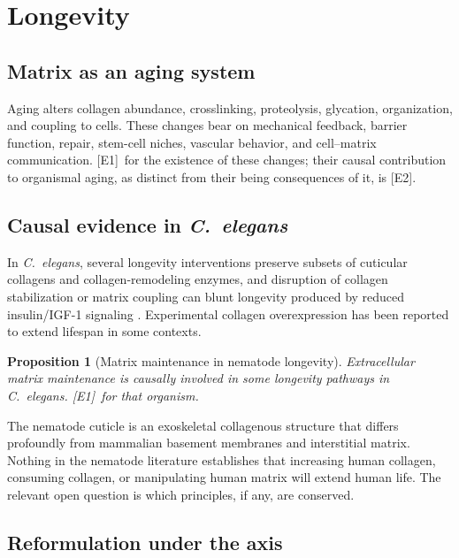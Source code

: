 \documentclass[11pt,a4paper]{article}
\theoremstyle{plain}
\newtheorem{proposition}{Proposition}[section]
\theoremstyle{definition}
\theoremstyle{remark}
\newcommand{\tier}[1]{\textup{\textsc{[#1]}}}
\newcommand{\Eone}{\tier{E1}}
\newcommand{\Etwo}{\tier{E2}}
\begin{document}
\section{Longevity}\label{sec:longevity}

\subsection{Matrix as an aging system}

Aging alters collagen abundance, crosslinking, proteolysis, glycation, organization, and coupling to cells. These changes bear on mechanical feedback, barrier function, repair, stem-cell niches, vascular behavior, and cell--matrix communication. \Eone\ for the existence of these changes; their causal contribution to organismal aging, as distinct from their being consequences of it, is \Etwo.

\subsection{Causal evidence in \emph{C.\ elegans}}

In \emph{C.\ elegans}, several longevity interventions preserve subsets of cuticular collagens and collagen-remodeling enzymes, and disruption of collagen stabilization or matrix coupling can blunt longevity produced by reduced insulin/IGF-1 signaling \cite{ewald2015,teuscher2024}. Experimental collagen overexpression has been reported to extend lifespan in some contexts.

\begin{proposition}[Matrix maintenance in nematode longevity]
Extracellular matrix maintenance is causally involved in some longevity pathways in \emph{C.\ elegans}. \Eone\ for that organism.
\end{proposition}

\begin{caution}
The nematode cuticle is an exoskeletal collagenous structure that differs profoundly from mammalian basement membranes and interstitial matrix. Nothing in the nematode literature establishes that increasing human collagen, consuming collagen, or manipulating human matrix will extend human life. The relevant open question is which principles, if any, are conserved.
\end{caution}

\subsection{Reformulation under the axis}
\end{document}

